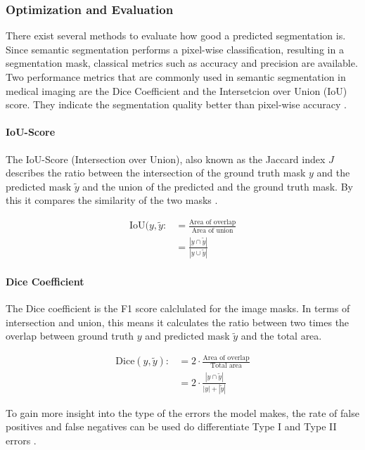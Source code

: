\subsubsection{Optimization and Evaluation}

There exist several methods to evaluate how good a predicted segmentation is. Since semantic segmentation performs a pixel-wise classification, resulting in a segmentation mask, classical metrics such as accuracy and precision are available. Two performance metrics that are commonly used in semantic segmentation in medical imaging are the Dice Coefficient and the Intersetcion over Union (IoU) score. They indicate the segmentation quality better than pixel-wise accuracy \cite{Eelbode}.

\paragraph{IoU-Score}

The IoU-Score (Intersection over Union), also known as the Jaccard index $J$ describes the ratio between the intersection of the ground truth mask $y$ and the predicted mask $\tilde{y}$ and the union of the predicted and the ground truth mask. By this it compares the similarity of the two masks \cite{Cho2021WeightedIO}.

\begin{align}
	\text{IoU}(y, \tilde{y} :&= \frac{\text{Area of overlap}}{\text{Area of union}}\\
	&=\frac{|y \cap \tilde{y}|}{|y \cup \tilde {y}|}
\end{align}


\paragraph{Dice Coefficient}

The Dice coefficient is the F1 score calclulated for the image masks. In terms of intersection and union, this means it calculates the ratio between two times the overlap between ground truth $y$ and predicted mask $\tilde{y}$ and the total area.

\begin{align}
	\text{Dice}(y, \tilde{y}) :&= 2 \cdot \frac{\text{Area of overlap}}{\text{Total area}}\\
	&= 2 \cdot \frac{|y \cap \tilde{y}|}{|y| + |\tilde{y}|}
\end{align}

To gain more insight into the type of the errors the model makes, the rate of false positives and false negatives can be used do differentiate Type I and Type II errors \cite{DFUC2022}.

